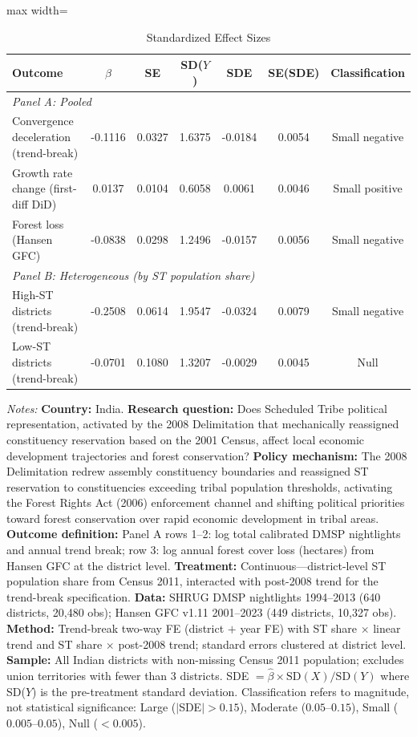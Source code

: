 \begin{table}[htbp]
\centering
\caption{Standardized Effect Sizes}\label{tab:sde}
\small
\begin{adjustbox}{max width=\textwidth}
\begin{tabular}{lcccccc}
\toprule
Outcome & $\hat{\beta}$ & SE & SD($Y$) & SDE & SE(SDE) & Classification \\
\midrule
\multicolumn{7}{l}{\textit{Panel A: Pooled}} \\
Convergence deceleration (trend-break) & -0.1116 & 0.0327 & 1.6375 & -0.0184 & 0.0054 & Small negative \\
Growth rate change (first-diff DiD) & 0.0137 & 0.0104 & 0.6058 & 0.0061 & 0.0046 & Small positive \\
Forest loss (Hansen GFC) & -0.0838 & 0.0298 & 1.2496 & -0.0157 & 0.0056 & Small negative \\
\midrule
\multicolumn{7}{l}{\textit{Panel B: Heterogeneous (by ST population share)}} \\
High-ST districts (trend-break) & -0.2508 & 0.0614 & 1.9547 & -0.0324 & 0.0079 & Small negative \\
Low-ST districts (trend-break) & -0.0701 & 0.1080 & 1.3207 & -0.0029 & 0.0045 & Null \\
\bottomrule
\end{tabular}
\end{adjustbox}
\vspace{0.5em}
\begin{minipage}{\textwidth}
\footnotesize
\textit{Notes:} \textbf{Country:} India. \textbf{Research question:} Does Scheduled Tribe political representation, activated by the 2008 Delimitation that mechanically reassigned constituency reservation based on the 2001 Census, affect local economic development trajectories and forest conservation? \textbf{Policy mechanism:} The 2008 Delimitation redrew assembly constituency boundaries and reassigned ST reservation to constituencies exceeding tribal population thresholds, activating the Forest Rights Act (2006) enforcement channel and shifting political priorities toward forest conservation over rapid economic development in tribal areas. \textbf{Outcome definition:} Panel A rows 1--2: log total calibrated DMSP nightlights and annual trend break; row 3: log annual forest cover loss (hectares) from Hansen GFC at the district level. \textbf{Treatment:} Continuous---district-level ST population share from Census 2011, interacted with post-2008 trend for the trend-break specification. \textbf{Data:} SHRUG DMSP nightlights 1994--2013 (640 districts, 20,480 obs); Hansen GFC v1.11 2001--2023 (449 districts, 10,327 obs). \textbf{Method:} Trend-break two-way FE (district $+$ year FE) with ST share $\times$ linear trend and ST share $\times$ post-2008 trend; standard errors clustered at district level. \textbf{Sample:} All Indian districts with non-missing Census 2011 population; excludes union territories with fewer than 3 districts. SDE $= \hat{\beta} \times \text{SD}(X) / \text{SD}(Y)$ where SD($Y$) is the pre-treatment standard deviation. Classification refers to magnitude, not statistical significance: Large ($|$SDE$| > 0.15$), Moderate ($0.05$--$0.15$), Small ($0.005$--$0.05$), Null ($< 0.005$).
\end{minipage}
\end{table}
